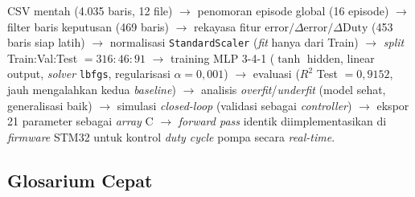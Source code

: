 \documentclass[11pt,a4paper]{article}
\begin{document}
CSV mentah (4.035 baris, 12 file) $\to$ penomoran episode global (16 episode) $\to$
filter baris keputusan (469 baris) $\to$ rekayasa fitur $\mathrm{error}/\Delta\mathrm{error}/\Delta\mathrm{Duty}$
(453 baris siap latih) $\to$ normalisasi \texttt{StandardScaler} (\emph{fit} hanya dari
Train) $\to$ \emph{split} Train:Val:Test $=316{:}46{:}91$ $\to$ training MLP 3-4-1
($\tanh$ hidden, linear output, \emph{solver} \texttt{lbfgs}, regularisasi
$\alpha=0{,}001$) $\to$ evaluasi ($R^2$ Test $=0{,}9152$, jauh mengalahkan kedua
\emph{baseline}) $\to$ analisis \emph{overfit}/\emph{underfit} (model sehat, generalisasi
baik) $\to$ simulasi \emph{closed-loop} (validasi sebagai \emph{controller}) $\to$
ekspor 21 parameter sebagai \emph{array} C $\to$ \emph{forward pass} identik
diimplementasikan di \emph{firmware} STM32 untuk kontrol \emph{duty cycle} pompa secara
\emph{real-time}.

\subsection{Glosarium Cepat}
\end{document}

